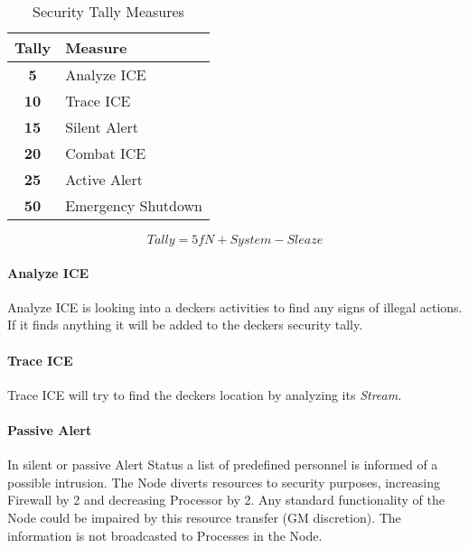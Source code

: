 \begin{table}[htb]
    \caption[Security Tally Measures]{Security Tally Measures}
    \label{tab:tally measures}
    \centering
    \begin{tabular}{cl}
        \toprule
        \textbf{Tally} & \textbf{Measure}   \\
        \midrule
        \textbf{5}     & Analyze ICE        \\
        \textbf{10}    & Trace ICE          \\
        \textbf{15}    & Silent Alert       \\
        \textbf{20}    & Combat ICE         \\
        \textbf{25}    & Active Alert       \\
        \textbf{50}    & Emergency Shutdown \\
        \bottomrule
    \end{tabular}
\end{table}



\begin{equation*}
    \textit{Tally} = \textit{5fN} + \textit{System} - \textit{Sleaze}
\end{equation*}

\paragraph{Analyze ICE}

Analyze ICE is looking into a deckers activities to find any signs of illegal
actions. If it finds anything it will be added to the deckers security tally.

\paragraph{Trace ICE}

Trace ICE will try to find the deckers location by analyzing its \emph{Stream}.

\paragraph{Passive Alert}
In silent or passive Alert Status a list of predefined personnel is informed
of a possible intrusion. The Node diverts resources to security purposes,
increasing Firewall by 2 and decreasing Processor by 2. Any standard functionality
of the Node could be impaired by this resource transfer (GM discretion).
The information is not broadcasted to Processes in the Node.

